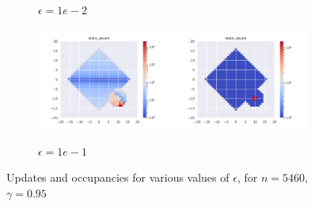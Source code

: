 \documentclass{article}
\begin{document}
\begin{figure}[H]
\begin{subfigure}[b]{\textwidth}
        \caption{$\epsilon=1e-2$}
    \end{subfigure}
    \begin{subfigure}[b]{\textwidth}
        \centering
        \includegraphics[width=0.49\textwidth]{img/epsilon/1e-1/updates_state_aware.pdf}
        \includegraphics[width=0.49\textwidth]{img/epsilon/1e-2/occupations_state_aware.pdf}
        \caption{$\epsilon=1e-1$}
    \end{subfigure}
    \caption{Updates and occupancies for various values of $\epsilon$, for $n = 5460$, $\gamma=0.95$}
    \label{fig:epsilon_1}
\end{figure}
\end{document}
